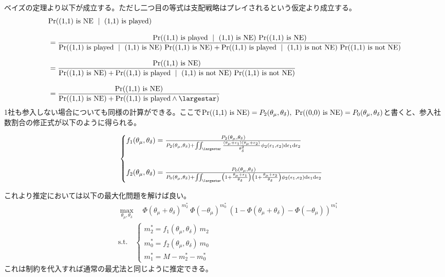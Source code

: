 \documentclass{jsarticle}
\begin{document}
ベイズの定理より以下が成立する。ただし二つ目の等式は支配戦略はプレイされるという仮定より成立する。
\begin{align*}
	&{\rm Pr}(\text{(1,1) is NE}\ \mid\ \text{(1,1) is played}) \\[8pt]
	&= \frac{{\rm Pr}(\text{(1,1) is played}\ \mid\ \text{(1,1) is NE})\ {\rm Pr}(\text{(1,1) is NE})}{{\rm Pr}(\text{(1,1) is played}\ \mid\ \text{(1,1) is NE})\ {\rm Pr}(\text{(1,1) is NE}) + {\rm Pr}(\text{(1,1) is played}\ \mid\ \text{(1,1) is not NE})\ {\rm Pr}(\text{(1,1) is not NE})}\\[8pt]
	&= \frac{{\rm Pr}(\text{(1,1) is NE})}{{\rm Pr}(\text{(1,1) is NE}) + {\rm Pr}(\text{(1,1) is played}\ \mid\ \text{(1,1) is not NE})\ {\rm Pr}(\text{(1,1) is not NE})}\\[8pt]
	&= \frac{{\rm Pr}(\text{(1,1) is NE})}{{\rm Pr}(\text{(1,1) is NE}) + {\rm Pr}(\text{(1,1) is played} \wedge \largestar)}
\end{align*}
1社も参入しない場合についても同様の計算ができる。ここで${\rm Pr}(\text{(1,1) is NE}) = P_2(\theta_{\mu}, \theta_{\delta}),\ {\rm Pr}(\text{(0,0) is NE}) = P_0(\theta_{\mu}, \theta_{\delta})$と書くと、参入社数割合の修正式が以下のように得られる。

\begin{align*}
\begin{cases}
	f_1(\theta_{\mu}, \theta_{\delta}) = \frac{P_2(\theta_{\mu}, \theta_{\delta})}{P_2(\theta_{\mu}, \theta_{\delta}) + \iint_{\largestar} \frac{(\theta_{\mu}+\epsilon_1)(\theta_{\mu} + \epsilon_2)}{\theta_{\delta}^2} \phi_2(\epsilon_1, \epsilon_2) \mathrm{d}\epsilon_1 \mathrm{d}\epsilon_2}\\[30pt]
	f_2(\theta_{\mu}, \theta_{\delta}) = \frac{P_0(\theta_{\mu}, \theta_{\delta})}{P_0(\theta_{\mu}, \theta_{\delta}) + \iint_{\largestar} \left( 1 + \frac{\theta_{\mu} + \epsilon_1}{\theta_{\delta}} \right) \left( 1 + \frac{\theta_{\mu} + \epsilon_2}{\theta_{\delta}} \right) \phi_2(\epsilon_1, \epsilon_2) \mathrm{d}\epsilon_1 \mathrm{d}\epsilon_2}
\end{cases}
\end{align*}

これより推定においては以下の最大化問題を解けば良い。
\begin{align*}
	&\max_{\theta_{\mu}, \theta_{\delta}}\quad \Phi(\theta_{\mu}+\theta_{\delta})^{m_2^{*}}\ \Phi(-\theta_{\mu})^{m_0^{*}}\  (1- \Phi(\theta_{\mu}+\theta_{\delta}) - \Phi(-\theta_{\mu}))^{m_1^{*}}\\
	&\text{s.t.}\quad \begin{cases}
	m_2^{*} = f_1(\theta_{\mu}, \theta_{\delta})\ m_2\\
	m_0^{*} = f_2(\theta_{\mu}, \theta_{\delta})\ m_0\\
	m_1^{*} = M - m_2^{*} - m_0^{*}
	\end{cases}
\end{align*}
これは制約を代入すれば通常の最尤法と同じように推定できる。
\end{document}
